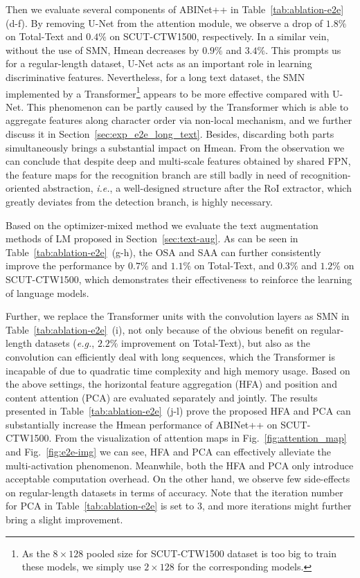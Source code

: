 \documentclass[10pt,journal,compsoc]{IEEEtran}
\def\ie{{\it i.e.}\xspace}
\def\eg{{\it e.g.}\xspace}
\begin{document}
Then we evaluate several components of ABINet++ in Table~\ref{tab:ablation-e2e} (d-f). By removing U-Net from the attention module, we observe a drop of $1.8\%$ on Total-Text and $0.4\%$ on SCUT-CTW1500, respectively. In a similar vein, without the use of SMN, Hmean decreases by $0.9\%$ and $3.4\%$. This prompts us for a regular-length dataset, U-Net acts as an important role in learning discriminative features. Nevertheless, for a long text dataset, the SMN implemented by a Transformer\footnote{As the $8 \times 128$ pooled size for SCUT-CTW1500 dataset is too big to train these models, we simply use $2 \times 128$ for the corresponding models.} appears to be more effective compared with U-Net. This phenomenon can be partly caused by the Transformer which is able to aggregate features along character order via non-local mechanism, and we further discuss it in Section~\ref{sec:exp_e2e_long_text}. Besides, discarding both parts simultaneously brings a substantial impact on Hmean. From the observation we can conclude that despite deep and multi-scale features obtained by shared FPN, the feature maps for the recognition branch are still badly in need of recognition-oriented abstraction, \ie, a well-designed structure after the RoI extractor, which greatly deviates from the detection branch, is highly necessary.


Based on the optimizer-mixed method we evaluate the text augmentation methods of LM proposed in Section~\ref{sec:text-aug}. As can be seen in Table~\ref{tab:ablation-e2e}~(g-h), the OSA and SAA can further consistently improve the performance by $0.7\%$ and $1.1\%$ on Total-Text, and $0.3\%$ and $1.2\%$ on SCUT-CTW1500, which demonstrates their effectiveness to reinforce the learning of language models. 


Further, we replace the Transformer units with the convolution layers as SMN in Table~\ref{tab:ablation-e2e}~(i), not only because of the obvious benefit on regular-length datasets (\eg, $2.2\%$ improvement on Total-Text), but also as the convolution can efficiently deal with long sequences, which the Transformer is incapable of due to quadratic time complexity and high memory usage. Based on the above settings, the horizontal feature aggregation (HFA) and position and content attention (PCA) are evaluated separately and jointly. The results presented in Table~\ref{tab:ablation-e2e}~(j-l) prove the proposed HFA and PCA can substantially increase the Hmean performance of ABINet++ on SCUT-CTW1500. From the visualization of attention maps in Fig.~\ref{fig:attention_map} and Fig.~\ref{fig:e2e-img} we can see, HFA and PCA can effectively alleviate the multi-activation phenomenon. Meanwhile, both the HFA and PCA only introduce acceptable computation overhead. On the other hand, we observe few side-effects on regular-length datasets in terms of accuracy. Note that the iteration number for PCA in Table~\ref{tab:ablation-e2e} is set to 3, and more iterations might further bring a slight improvement.
\end{document}
